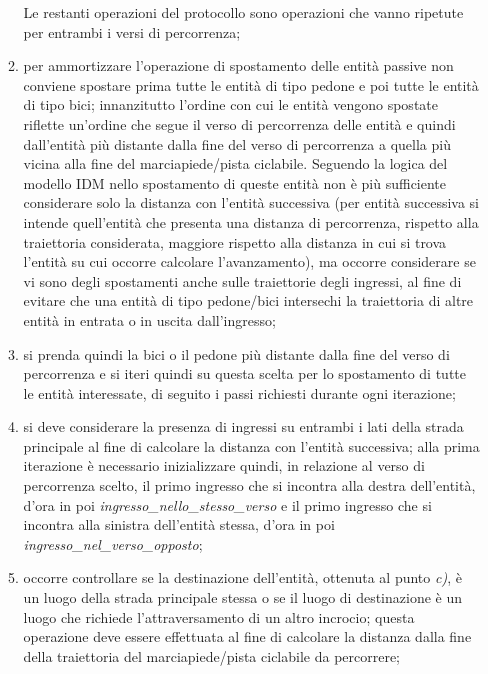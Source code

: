 \begin{enumerate}
\begin{enumerate}
Le restanti operazioni del protocollo sono operazioni che vanno ripetute per entrambi i versi di percorrenza;
\item per ammortizzare l'operazione di spostamento delle entità passive non conviene spostare prima tutte le entità di tipo pedone e poi tutte le entità di tipo bici; innanzitutto l'ordine con cui le entità vengono spostate riflette un'ordine che segue il verso di percorrenza delle entità e quindi dall'entità più distante dalla fine del verso di percorrenza a quella più vicina alla fine del marciapiede/pista ciclabile. Seguendo la logica del modello IDM nello spostamento di queste entità non è più sufficiente considerare solo la distanza con l'entità successiva (per entità successiva si intende quell'entità che presenta una distanza di percorrenza, rispetto alla traiettoria considerata, maggiore rispetto alla distanza in cui si trova l'entità su cui occorre calcolare l'avanzamento), ma occorre considerare se vi sono degli spostamenti anche sulle traiettorie degli ingressi, al fine di evitare che una entità di tipo pedone/bici intersechi la traiettoria di altre entità in entrata o in uscita dall'ingresso;
\item si prenda quindi la bici o il pedone più distante dalla fine del verso di percorrenza e si iteri quindi su questa scelta per lo spostamento di tutte le entità interessate, di seguito i passi richiesti durante ogni iterazione;
\item si deve considerare la presenza di ingressi su entrambi i lati della strada principale al fine di calcolare la distanza con l'entità successiva; alla prima iterazione è necessario inizializzare quindi, in relazione al verso di percorrenza scelto, il primo ingresso che si incontra alla destra dell'entità, d'ora in poi \textit{ingres\-so\_nel\-lo\_stes\-so\_ver\-so} e il primo ingresso che si incontra alla sinistra dell'entità stessa, d'ora in poi \textit{ingres\-so\_nel\_ver\-so\_op\-pos\-to};   
\item occorre controllare se la destinazione dell'entità, ottenuta al punto \textit{c)}, è un luogo della strada principale stessa o se il luogo di destinazione è un luogo che richiede l'attraversamento di un altro incrocio; questa operazione deve essere effettuata al fine di calcolare la distanza dalla fine della traiettoria del marciapiede/pista ciclabile da percorrere;

\end{enumerate}
\end{enumerate}
